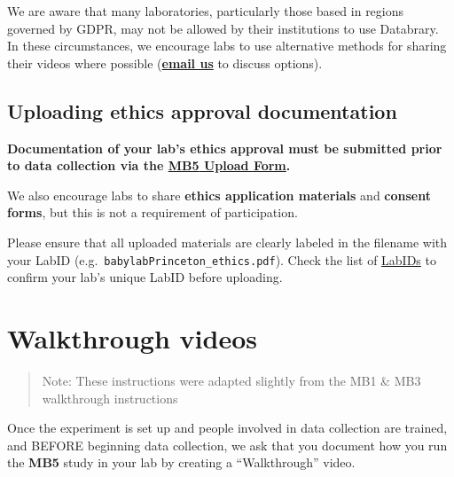 \documentclass[
  letterpaper,
  DIV=11,
  numbers=noendperiod,
  oneside]{scrreprt}
\begin{document}
\begin{tcolorbox}[enhanced jigsaw, coltitle=black, colframe=quarto-callout-warning-color-frame, titlerule=0mm, colback=white, arc=.35mm, toprule=.15mm, left=2mm, colbacktitle=quarto-callout-warning-color!10!white, opacityback=0, bottomtitle=1mm, title=\textcolor{quarto-callout-warning-color}{\faExclamationTriangle}\hspace{0.5em}{Databrary limitations}, breakable, rightrule=.15mm, opacitybacktitle=0.6, toptitle=1mm, leftrule=.75mm, bottomrule=.15mm]

We are aware that many laboratories, particularly those based in regions
governed by GDPR, may not be allowed by their institutions to use
Databrary. In these circumstances, we encourage labs to use alternative
methods for sharing their videos where possible
(\href{mailto:mb5@manybabies.org}{\textbf{email us}} to discuss
options).

\end{tcolorbox}

\section{Uploading ethics approval documentation}\label{ethics-upload}

\textbf{Documentation of your lab's ethics approval must be submitted
prior to data collection via the
\href{https://airtable.com/appRoqMKzcK3NsXt4/pagTs6VPOhcjesYd5/form}{\textbf{\textbf{MB5}
Upload Form}}.}

We also encourage labs to share \textbf{ethics application materials}
and \textbf{consent forms}, but this is not a requirement of
participation.

Please ensure that all uploaded materials are clearly labeled in the
filename with your LabID (e.g.~\texttt{babylabPrinceton\_ethics.pdf}).
Check the list of \href{https://manybabies.org/labids/}{LabIDs} to
confirm your lab's unique LabID before uploading.

\chapter{Walkthrough videos}\label{sec-walkthrough}

\begin{quote}
Note: These instructions were adapted slightly from the MB1 \& MB3
walkthrough instructions
\end{quote}

Once the experiment is set up and people involved in data collection are
trained, and BEFORE beginning data collection, we ask that you document
how you run the \textbf{MB5} study in your lab by creating a
``Walkthrough'' video.
\end{document}
